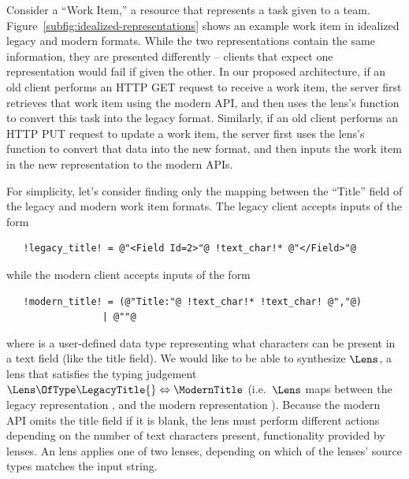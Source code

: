 \documentclass[acmsmall,screen]{acmart}
\begin{document}
Consider a ``Work Item,'' a resource that represents a task given to a
team.  Figure~\ref{subfig:idealized-representations} shows an
example work item in idealized legacy and modern formats.
While the two representations contain the same information, they are presented
differently -- clients that expect one representation would fail if given
the other.
In our proposed architecture, if an old
client performs an HTTP GET request to receive a work item, the server first
retrieves that work item using the modern API, and then uses the
lens's \PutLeft{} function to convert this task into the legacy format.  Similarly,
if an old client performs an HTTP PUT request to update a work item, the server
first uses the lens's 
\PutRight{} function to convert that data into the
new format, and then inputs the work item in the new representation to the
modern APIs.    

For simplicity, let's consider finding only the mapping between the
``Title'' field of the legacy and modern work item formats.
The legacy client accepts inputs of the form 
%
\begin{lstlisting}
   !legacy_title! = @"<Field Id=2>"@ !text_char!* @"</Field>"@
\end{lstlisting}
while the modern client accepts inputs of the form
\begin{lstlisting}
   !modern_title! = (@"Title:"@ !text_char!* !text_char! @","@)
                 | @""@
\end{lstlisting}
%
where \TextChar{} is a user-defined data type representing what characters can
be present in a text field (like the title field).
We would like to be able to synthesize $\Lens$, a lens that satisfies the
typing judgement $\Lens \OfType \LegacyTitle{} \Leftrightarrow \ModernTitle$
(i.e.\ $\Lens$ maps between the legacy representation \LegacyTitle{}, and the modern
representation \ModernTitle{}).
Because the modern API omits the title field if it is blank, the lens must
perform different 
actions depending on the number of text characters present,
functionality provided by \OrLens{} lenses.
An \OrLens{} lens applies one of two lenses, depending on which of the lenses'
source types matches the input string.
\end{document}
